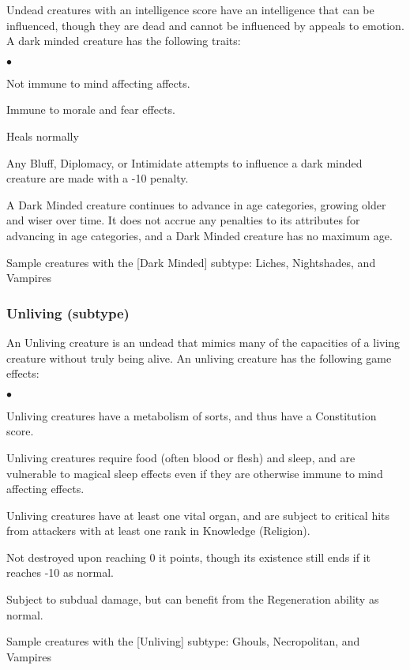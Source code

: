 Undead creatures with an intelligence score have an intelligence that can be influenced, though they are dead and cannot be influenced by appeals to emotion. A dark minded creature has the following traits:
\begin{list}{$\bullet$}{\itemspace}
\item Not immune to mind affecting affects.
\item Immune to morale and fear effects.
\item Heals normally
\item Any Bluff, Diplomacy, or Intimidate attempts to influence a dark minded creature are made with a -10 penalty.
\item A Dark Minded creature continues to advance in age categories, growing older and wiser over time. It does not accrue any penalties to its attributes for advancing in age categories, and a Dark Minded creature has no maximum age.
\item Sample creatures with the [Dark Minded] subtype:
Liches,
Nightshades, and
Vampires
\end{list}

\subsubsection{Unliving (subtype)} \label{undead:unliving}

An Unliving creature is an undead that mimics many of the capacities of a living creature without truly being alive. An unliving creature has the following game effects:

\begin{list}{$\bullet$}{\itemspace} \item Unliving creatures have a metabolism of sorts, and thus have a Constitution score.
\item Unliving creatures require food (often blood or flesh) and sleep, and are vulnerable to magical sleep effects even if they are otherwise immune to mind affecting effects.
\item Unliving creatures have at least one vital organ, and are subject to critical hits from attackers with at least one rank in Knowledge (Religion).
\item Not destroyed upon reaching 0 it points, though its existence still ends if it reaches -10 as normal.
\item Subject to subdual damage, but can benefit from the Regeneration ability as normal.
\item Sample creatures with the [Unliving] subtype:
Ghouls,
Necropolitan, and
Vampires
\end{list}


